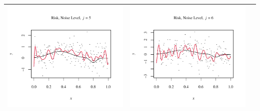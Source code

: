 \documentclass[11pt]{article}
\begin{document}
\begin{table}[h!]
\begin{center}
\begin{tabular}{| >{\centering\arraybackslash}m{2.1in} |  >{\centering\arraybackslash}m{2.1in} |  >{\centering\arraybackslash}m{2.1in}|}
      \includegraphics[width=1\linewidth,height=0.18\textheight]{Graphs/4/1/assignment5_a_4_1_5}&
      \includegraphics[width=1\linewidth,height=0.18\textheight]{Graphs/4/1/assignment5_a_4_1_6}\\\hline
    \end{tabular}
  \end{center}
\end{table}
\end{document}
